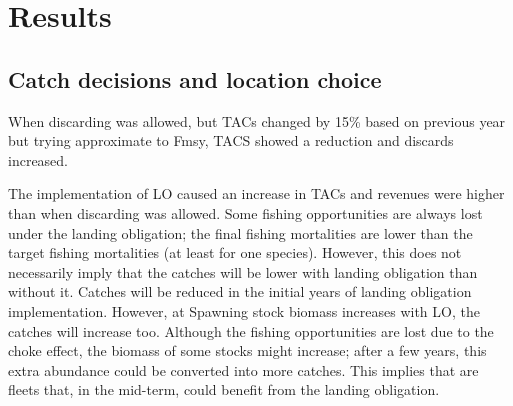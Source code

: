 \documentclass[12pt,oneline,a4paper,numbib]{ouparticle}
\numberwithin{equation}{subsection} %
\begin{document}

\section{Results}


\subsection{Catch decisions and location choice}

When discarding was allowed, but TACs changed by 15\% based on previous year but trying approximate to Fmsy, TACS showed a reduction and discards increased. 

The implementation of LO caused an increase in TACs and revenues were higher than when discarding was allowed. Some fishing opportunities are always lost under the landing obligation; the final fishing mortalities are lower than the target fishing mortalities (at least for one species). However, this does not necessarily imply that the catches will be lower with landing obligation than without it. Catches will be reduced in the initial years of landing obligation implementation. However, at Spawning stock biomass increases with LO, the catches will increase too. Although the fishing opportunities are lost due to the choke effect, the biomass of some stocks might increase; after a few years, this extra abundance could be converted into more catches. This implies that are fleets that, in the mid-term, could benefit from the landing obligation.
\end{document}
